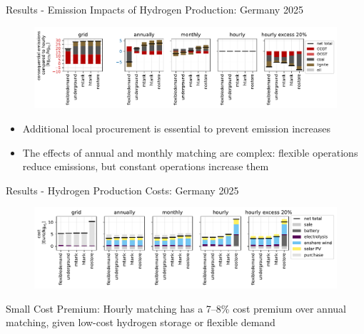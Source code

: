 \begin{frame}{Results - Emission Impacts of Hydrogen Production: Germany 2025}
	\addtocounter{framenumber}{-1}
	\begin{figure}
		\centering
		\includegraphics[width=1\linewidth]{images/consequential_emissions_by_carrier_3200wmonthly.pdf}
	\end{figure}
	\begin{itemize}
		\item \alert{Additional local procurement} is \alert{essential} to prevent emission increases
		\item The effects of annual and monthly matching are complex: \alert{flexible operations reduce} emissions, but \alert{constant} operations \alert{increase} them
	\end{itemize}
\end{frame}

\begin{frame}{Results - Hydrogen Production Costs: Germany 2025}
	\begin{figure}
		\centering
		\includegraphics[width=1\linewidth]{images/costbreakdown_3200wmonthly.pdf}
		\label{fig:costbreakdown3200}
	\end{figure}
	\alert{Small Cost Premium}: Hourly matching has a 7--8\% cost premium over annual matching, given low-cost hydrogen storage or flexible demand
\end{frame}


